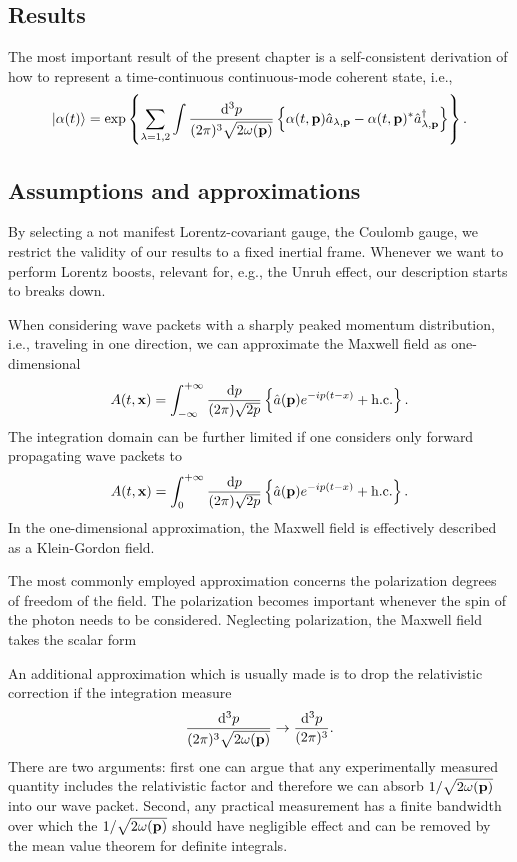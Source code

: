 
\subsection*{Results}

The most important result of the present chapter is a self-consistent derivation of how to represent a time-continuous continuous-mode coherent state, i.e.,
\begin{equation}
	\ket{\alpha(t)}
	=
	\exp\left\{
		\sum_{\lambda=1,2}
		\int\frac{\dd[3]{p}}{(2\pi)^3\sqrt{2\omega(\vb{p})}}
		\left\{
			\alpha(t,\vb{p})
			\hat{a}_{\lambda,\vb{p}}
			-
			\alpha(t,\vb{p})^*
			\hat{a}_{\lambda,\vb{p}}^\dagger
		\right\}
	\right\}
	.
\end{equation}

\subsection*{Assumptions and approximations}

By selecting a not manifest Lorentz-covariant gauge, the Coulomb gauge, we restrict the validity of our results to a fixed inertial frame.
Whenever we want to perform Lorentz boosts, relevant for, e.g., the Unruh effect, our description starts to breaks down.

When considering wave packets with a sharply peaked momentum distribution, i.e., traveling in one direction, we can approximate the Maxwell field as one-dimensional
\begin{equation}
	A(t,\vb{x})
	=
	\int_{-\infty}^{+\infty}
	\frac{\dd{p}}{(2\pi)\sqrt{2p}}
	\left\{
		\hat{a}(\vb{p})
		e^{-ip(t-x)}
		+
		\text{h.c.}
	\right\}
	.
\end{equation}
The integration domain can be further limited if one considers only forward propagating wave packets to
\begin{equation}
	A(t,\vb{x})
	=
	\int_0^{+\infty}
	\frac{\dd{p}}{(2\pi)\sqrt{2p}}
	\left\{
		\hat{a}(\vb{p})
		e^{-ip(t-x)}
		+
		\text{h.c.}
	\right\}
	.
\end{equation}
In the one-dimensional approximation, the Maxwell field is effectively described as a Klein-Gordon field.

The most commonly employed approximation concerns the polarization degrees of freedom of the field.
The polarization becomes important whenever the spin of the photon needs to be considered.
Neglecting polarization, the Maxwell field takes the scalar form

An additional approximation which is usually made is to drop the relativistic correction if the integration measure
\begin{equation*}
	\frac{\dd[3]{p}}{(2\pi)^3\sqrt{2\omega(\vb{p})}}
	\to
	\frac{\dd[3]{p}}{(2\pi)^3}
	.
\end{equation*}
There are two arguments: first one can argue that any experimentally measured quantity includes the relativistic factor and therefore we can absorb $1/\sqrt{2\omega(\vb{p})}$ into our wave packet.
Second, any practical measurement has a finite bandwidth over which the $1/\sqrt{2\omega(\vb{p})}$ should have negligible effect and can be removed by the mean value theorem for definite integrals.